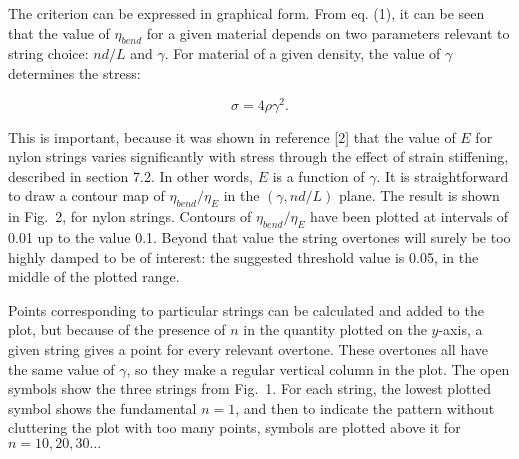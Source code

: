   The criterion can be expressed in graphical form. From eq. (1), it can be 
  seen that the value of $\eta_{bend}$ for a given material depends on two 
  parameters relevant to string choice: $nd/L$ and $\gamma$. For material of a 
  given density, the value of $\gamma$ determines the stress: 

  $$\sigma = 4 \rho \gamma^2. \tag{2}$$ 

  This is important, because it was shown in reference [2] that the value of 
  $E$ for nylon strings varies significantly with stress through the effect of 
  strain stiffening, described in section 7.2. In other words, $E$ is a 
  function of $\gamma$. It is straightforward to draw a contour map of 
  $\eta_{bend}/\eta_E$ in the $(\gamma, nd/L)$ plane. The result is shown in 
  Fig.\ 2, for nylon strings. Contours of $\eta_{bend}/\eta_E$ have been 
  plotted at intervals of 0.01 up to the value 0.1. Beyond that value the 
  string overtones will surely be too highly damped to be of interest: the 
  suggested threshold value is 0.05, in the middle of the plotted range. 


  Points corresponding to particular strings can be calculated and added to the 
  plot, but because of the presence of $n$ in the quantity plotted on the 
  $y$-axis, a given string gives a point for every relevant overtone. These 
  overtones all have the same value of $\gamma$, so they make a regular 
  vertical column in the plot. The open symbols show the three strings from 
  Fig.\ 1. For each string, the lowest plotted symbol shows the fundamental 
  $n=1$, and then to indicate the pattern without cluttering the plot with too 
  many points, symbols are plotted above it for $n=10, 20, 30...$ 

